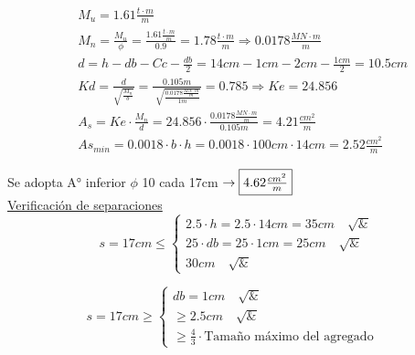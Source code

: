 \begin{enumerate}
\begin{itemize}
\begin{align*}
& M_u = 1.61 \frac{t \cdot m}{m} \\
& M_n = \frac{M_u}{\phi} = \frac{1.61 \frac{t \cdot m}{m}}{0.9} = 1.78 \frac{t \cdot m}{m} \Rightarrow 0.0178 \frac{MN \cdot m}{m} \\
& d = h -db - Cc - \frac{db}{2} = 14cm - 1cm - 2cm - \frac{1cm}{2}= 10.5cm \\
& Kd = \frac{d}{\sqrt{\frac{M_n}{b}}} = \frac{0.105m}{\sqrt[]{\frac{0.0178 \frac{MN \cdot m}{m}}{1m}}} = 0.785 \Rightarrow Ke = 24.856 \\
& A_s = Ke \cdot \frac{M_n}{d} = 24.856 \cdot \frac{0.0178 \frac{MN \cdot m}{m}}{0.105m} = 4.21 \frac{cm^2}{m}\\
& As_{min} = 0.0018 \cdot b \cdot h = 0.0018 \cdot 100cm \cdot 14cm = 2.52 \frac{cm^2}{m}
\end{align*}

Se adopta A° inferior $\phi$ 10 cada 17cm $\rightarrow \framebox{$4.62 \frac{cm^2}{m}$}$ \\

\underline{Verificación de separaciones}\\

\[ s = 17cm \leq \left\{ \begin{array}{ll}
         2.5 \cdot h = 2.5 \cdot 14cm = 35cm \quad \surd & \\
         25 \cdot db = 25 \cdot 1cm = 25cm \quad \surd &\\
         30cm \quad \surd & \end{array} \right. \] 
         
\[ s = 17cm \geq \left\{ \begin{array}{ll}
         db = 1cm \quad \surd & \\
         \geq 2.5cm \quad \surd &\\
         \geq \frac{4}{3} \cdot \text{Tamaño máximo del agregado} & \end{array} \right. \] 

\end{itemize}
\end{enumerate}
